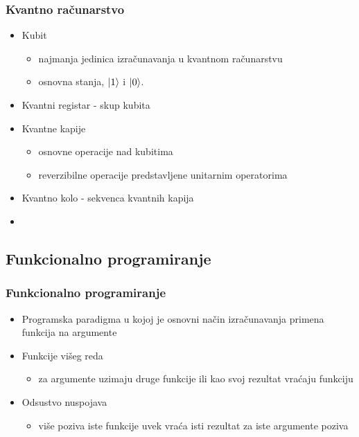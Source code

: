 \documentclass[12pt,hyperref={unicode}]{beamer}
\begin{document}

\begin{frame}
\frametitle{Kvantno računarstvo}
\begin{itemize}
\item{Kubit}
\begin{itemize}
    \item{najmanja jedinica izračunavanja u kvantnom računarstvu}\\
    \item{osnovna stanja, $\ket{1}$ i $\ket{0}$.}\\
    \end{itemize}
\item{Kvantni registar - skup kubita}
\item{Kvantne kapije}
\begin{itemize}
    \item{osnovne operacije nad kubitima}
    \item{reverzibilne operacije predstavljene unitarnim operatorima}
    \end{itemize}
\item{Kvantno kolo - sekvenca kvantnih kapija}
\item{}
\end{itemize}
\end{frame}

\subsection{Funkcionalno programiranje}

\begin{frame}
\frametitle{Funkcionalno programiranje}
\begin{itemize}
\item{Programska paradigma u kojoj je osnovni način izračunavanja primena funkcija na argumente}
\item{Funkcije višeg reda}
    \begin{itemize}
    \item{za argumente uzimaju druge funkcije ili kao svoj rezultat vraćaju funkciju }
    \end{itemize}
\item{Odsustvo nuspojava}
  	\begin{itemize}
	\item{više poziva iste funkcije uvek vraća isti rezultat za iste argumente poziva}
  	\end{itemize}
\end{itemize}

\end{frame}
\end{document}
